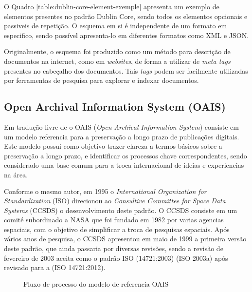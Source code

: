 O Quadro \ref{table:dublin-core-element-exemple} apresenta um exemplo de
elementos presentes no padrão Dublin Core, sendo todos os elementos opcionais
e passiveis de repetição. O esquema em si é independente de um formato em especifico, sendo
possível apresenta-lo em diferentes formatos como XML e JSON.

Originalmente, o esquema foi produzido como um método para descrição de
documentos na internet, como em \emph{websites}, de forma a utilizar de
\emph{meta tags} presentes no cabeçalho dos documentos. Tais \emph{tags}
podem ser facilmente utilizadas por ferramentas de pesquisa para explorar
e indexar documentos.

\subsection{Open Archival Information System (OAIS)}

Em tradução livre de \cite{2007:Borghoff} o OAIS
(\emph{Open Archival Information System}) consiste em um
modelo referencia para a preservação a longo prazo de publicações
digitais. Este modelo possui como objetivo trazer clareza a termos
básicos sobre a preservação a longo prazo, e identificar os processos
chave correspondentes, sendo considerado uma base comum para a troca
internacional de ideias e experiencias na área.

Conforme o mesmo autor, em 1995 o \emph{International Organization for Standardization} (ISO)
direcionou ao \emph{Consultive Committee for Space Data Systems} (CCSDS)
o desenvolvimento deste padrão. O CCSDS consiste em um comité subordinado
a NASA que foi fundado em 1982 por varias agencias espaciais, com o objetivo
de simplificar a troca de pesquisas espaciais. Após vários anos de pesquisa,
o CCSDS apresentou em maio de 1999 a primeira versão deste padrão, que ainda
passaria por diversas revisões, sendo a revisão de fevereiro de 2003
aceita como o padrão ISO (14721:2003) (ISO 2003a) após revisado para a (ISO 14721:2012).

\begin{figure}[H]
    \caption{Fluxo de processo do modelo de referencia OAIS}
    \label{fig:oais-reference-model}
    \centering
\end{figure}

